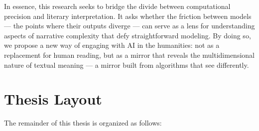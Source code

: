 \documentclass[a4paper,12pt]{report}
\begin{document}
In essence, this research seeks to bridge the divide between computational precision and literary interpretation. It asks whether the friction between models — the points where their outputs diverge — can serve as a lens for understanding aspects of narrative complexity that defy straightforward modeling.
By doing so, we propose a new way of engaging with AI in the humanities: not as a replacement for human reading, but as a mirror that reveals the multidimensional nature of textual meaning — a mirror built from algorithms that see differently.

\section{Thesis Layout}
The remainder of this thesis is organized as follows:
\end{document}
